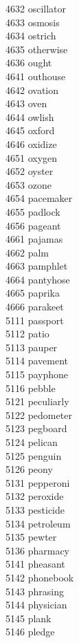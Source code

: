 4632 oscillator \\
4633 osmosis \\
4634 ostrich \\
4635 otherwise \\
4636 ought \\
4641 outhouse \\
4642 ovation \\
4643 oven \\
4644 owlish \\
4645 oxford \\
4646 oxidize \\
4651 oxygen \\
4652 oyster \\
4653 ozone \\
4654 pacemaker \\
4655 padlock \\
4656 pageant \\
4661 pajamas \\
4662 palm \\
4663 pamphlet \\
4664 pantyhose \\
4665 paprika \\
4666 parakeet \\
5111 passport \\
5112 patio \\
5113 pauper \\
5114 pavement \\
5115 payphone \\
5116 pebble \\
5121 peculiarly \\
5122 pedometer \\
5123 pegboard \\
5124 pelican \\
5125 penguin \\
5126 peony \\
5131 pepperoni \\
5132 peroxide \\
5133 pesticide \\
5134 petroleum \\
5135 pewter \\
5136 pharmacy \\
5141 pheasant \\
5142 phonebook \\
5143 phrasing \\
5144 physician \\
5145 plank \\
5146 pledge \\
